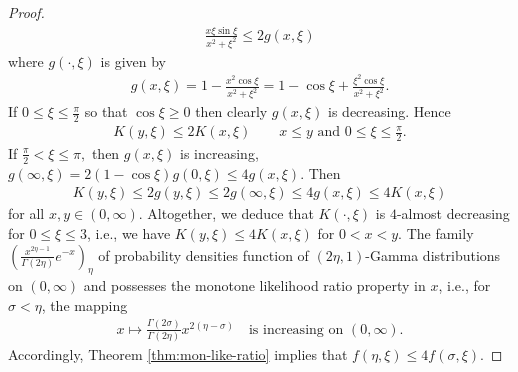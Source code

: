 \documentclass[12pt, reqno]{amsart}%
\theoremstyle{plain}  %
\theoremstyle{definition}  %
\theoremstyle{remark}
\numberwithin{equation}{section}
\begin{document}
\begin{proof}
\begin{align*}
\frac{x\xi\sin\xi}{x^2+\xi^2}\leq 2g(x, \xi)
\end{align*}
where $g(\cdot,\xi)$ is given by
\begin{align*}
g(x,\xi)= 1-\frac{x^2\cos\xi}{x^2+\xi^2}= 1-\cos\xi + \frac{\xi^2\cos\xi}{x^2+\xi^2}.
\end{align*}
If $0\leq \xi\leq \frac{\pi}{2}$ so that  $\cos \xi\geq 0$ then clearly $g(x,\xi)$ is decreasing. Hence
\begin{align*}
K(y,\xi)\leq 2K(x,\xi)\qquad \text{$x\leq y$ and $0\leq \xi\leq \frac{\pi}{2}$}.
\end{align*}
If $\frac{\pi}{2}<\xi\leq \pi,$ then $g(x,\xi)$  is increasing, $g(\infty,\xi) =2(1-\cos\xi ) g(0, \xi) \leq 4  g(x,\xi)$. Then
\begin{align*}
 K(y,\xi)\leq 2 g(y,\xi)\leq 2 g(\infty,\xi) \leq 4  g(x,\xi) \leq 4 K(x,\xi)
\end{align*}
for all $x,y\in (0,\infty)$. Altogether, we deduce that $K(\cdot,\xi)$ is $4$-almost decreasing for $0\leq \xi\leq 3$, i.e., we have $K(y,\xi)\leq 4K(x,\xi) $ for $0<x<y$.  The  family $(\frac{x^{2\eta-1}}{\Gamma(2\eta)} e^{-x})_\eta$  of probability densities function of  $(2\eta,1)$-Gamma distributions  on $(0,\infty)$ and
possesses the monotone likelihood ratio property in $x$, i.e.,  for $\sigma<\eta$, the mapping
\begin{align*}
x\mapsto  \frac{\Gamma(2\sigma)}{\Gamma(2\eta)}x^{2(\eta-\sigma)}
\quad\text{is increasing on $(0,\infty)$}.
\end{align*}
Accordingly, Theorem \ref{thm:mon-like-ratio} implies
that  $f(\eta,\xi)\leq 4f(\sigma,\xi)$.
\end{proof}
\end{document}
